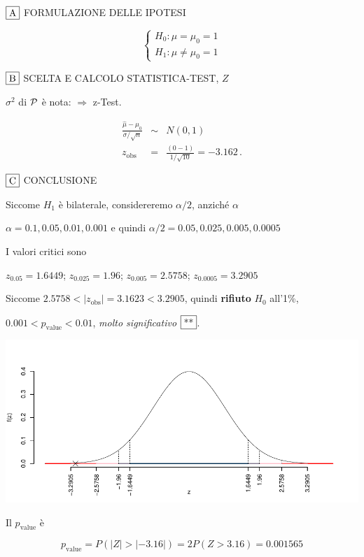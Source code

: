 \documentclass[
  11pt,
]{book}
\theoremstyle{mytheoremstyle}
\theoremstyle{mydefstyle}
\begin{document}
\(\fbox{A}\) FORMULAZIONE DELLE IPOTESI

\[\begin{cases}
   H_0: \mu = \mu_0=1 \\
   H_1: \mu \neq \mu_0=1 
   \end{cases}\]

\(\fbox{B}\) SCELTA E CALCOLO STATISTICA-TEST, \(Z\)

\(\sigma^{2}\) di \(\cal{P}\) è nota: \(\Rightarrow\) z-Test.

\begin{eqnarray*}
   \frac{\hat\mu - \mu_{0}} {\sigma/\sqrt{n}}&\sim&N(0,1)\\
   z_{\text{obs}}
   &=& \frac{ ( 0 -  1 )} { 1 /\sqrt{ 10 }}
   =   -3.162 \, .
   \end{eqnarray*}

\(\fbox{C}\) CONCLUSIONE

Siccome \(H_1\) è bilaterale, considereremo \(\alpha/2\),
anziché \(\alpha\)

\(\alpha=0.1, 0.05, 0.01, 0.001\) e quindi \(\alpha/2=0.05, 0.025, 0.005, 0.0005\)

I valori critici sono

\(z_{0.05}=1.6449\); \(z_{0.025}=1.96\); \(z_{0.005}=2.5758\); \(z_{0.0005}=3.2905\)

Siccome \(2.5758<|z_\text{obs}|=3.1623<3.2905\), quindi \textbf{rifiuto} \(H_0\) all'1\%,

\(0.001<p_\text{value}<0.01\), \emph{molto significativo} \(\fbox{**}\).

\begin{center}\includegraphics{Appunti_di_Statistica_2025_files/figure-latex/25-test-functions-10-2} \end{center}

Il \(p_{\text{value}}\) è

\[ p_{\text{value}} = P(|Z|>|-3.16|)=2P(Z>3.16)=0.001565 \]
\end{document}
